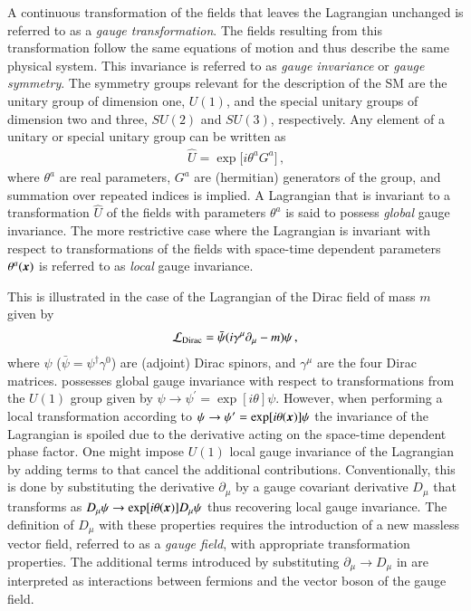
A continuous transformation of the fields that leaves the Lagrangian unchanged
is referred to as a \emph{gauge transformation}. The fields resulting from this
transformation follow the same equations of motion and thus describe the same
physical system. This invariance is referred to as \emph{gauge invariance} or
\emph{gauge symmetry}. The symmetry groups relevant for the description of the
SM are the unitary group of dimension one, $U(1)$, and the special unitary
groups of dimension two and three, $SU(2)$ and $SU(3)$, respectively. Any
element of a unitary or special unitary group can be written as
\begin{align*}
  \hat{U} = \exp\big[ i \theta^a G^a \big] \,\text{,}
\end{align*}
where $\theta^a$ are real parameters, $G^a$ are (hermitian) generators of the
group, and summation over repeated indices is implied. A Lagrangian that is
invariant to a transformation $\hat{U}$ of the fields with parameters $\theta^a$
is said to possess \emph{global} gauge invariance. The more restrictive case
where the Lagrangian is invariant with respect to transformations of the fields
with space-time dependent parameters $\theta^a(\myvec{x})$ is referred to as
\emph{local} gauge invariance.

This is illustrated in the case of the Lagrangian of the Dirac field of mass $m$
given by
\begin{align}
  \mathcal{L}_{\text{Dirac}} = \bar{\psi} (i \gamma^\mu  \partial_\mu - m) \psi \,\text{,}
  \label{eq:dirac_lagrangian}
\end{align}
where $\psi$ ($\bar{\psi} = \psi^\dagger \gamma^0$) are (adjoint) Dirac spinors,
and $\gamma^\mu$ are the four Dirac matrices. 
possesses global gauge invariance with respect to transformations from the
$U(1)$ group given by $\psi \to \psi^\prime = \exp[ i \theta ] \psi$. However,
when performing a local transformation according to
$\psi \to \psi^\prime = \exp[ i \theta(\myvec{x}) ] \psi$ the invariance of the
Lagrangian is spoiled due to the derivative acting on the space-time dependent
phase factor. One might impose $U(1)$ local gauge invariance of the Lagrangian
by adding terms to  that cancel the additional
contributions. Conventionally, this is done by substituting the derivative
$\partial_\mu$ by a gauge covariant derivative $D_\mu$ that transforms as
$D_\mu\psi \to \exp[ i \theta(\myvec{x}) ] D_\mu\psi$ thus recovering local
gauge invariance. The definition of $D_\mu$ with these properties requires the
introduction of a new massless vector field, referred to as a \emph{gauge
  field}, with appropriate transformation properties. The additional terms
introduced by substituting $\partial_\mu \to D_\mu$ in
 are interpreted as interactions between fermions and
the vector boson of the gauge field.

